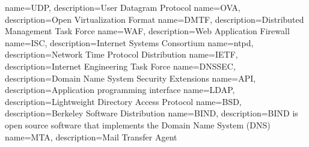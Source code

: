 {
  name=UDP,
  description={User Datagram Protocol}
}
{
  name=OVA,
  description={Open Virtualization Format}
}
{
  name=DMTF,
  description={Distributed Management Task Force}
}
{
  name=WAF,
  description={Web Application Firewall}
}
{
  name=ISC,
  description={Internet Systems Consortium}
}
{
  name=ntpd,
  description={Network Time Protocol Distribution}
}
{
  name=IETF,
  description={Internet Engineering Task Force}
}
{
  name=DNSSEC,
  description={Domain Name System Security Extensions}
}
{
  name=API,
  description={Application programming interface}
}
{
  name=LDAP,
  description={Lightweight Directory Access Protocol}
}
{
  name=BSD,
  description={Berkeley Software Distribution}
}
{
  name=BIND,
  description={BIND is open source software that implements the Domain Name System (\gls{DNS}) }
}
{
  name=MTA,
  description={Mail Transfer Agent}
}





